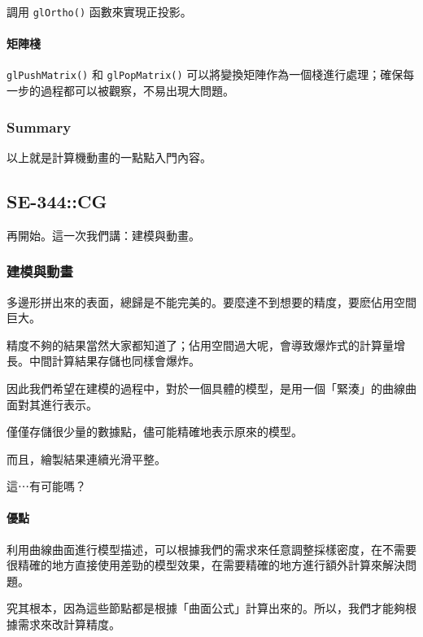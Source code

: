 \documentclass[
]{article}
\begin{document}
調用 \texttt{glOrtho()} 函數來實現正投影。

\hypertarget{header-n100}{%
\paragraph{矩陣棧}\label{header-n100}}

\texttt{glPushMatrix()} 和 \texttt{glPopMatrix()}
可以將變換矩陣作為一個棧進行處理；確保每一步的過程都可以被觀察，不易出現大問題。

\hypertarget{header-n102}{%
\subsubsection{Summary}\label{header-n102}}

以上就是計算機動畫的一點點入門內容。

\hypertarget{header-n104}{%
\subsection{SE-344::CG}\label{header-n104}}

再開始。這一次我們講：建模與動畫。

\hypertarget{header-n106}{%
\subsubsection{建模與動畫}\label{header-n106}}

多邊形拼出來的表面，總歸是不能完美的。要麼達不到想要的精度，要麽佔用空間巨大。

精度不夠的結果當然大家都知道了；佔用空間過大呢，會導致爆炸式的計算量增長。中間計算結果存儲也同樣會爆炸。

因此我們希望在建模的過程中，對於一個具體的模型，是用一個「緊湊」的曲線曲面對其進行表示。

僅僅存儲很少量的數據點，儘可能精確地表示原來的模型。

而且，繪製結果連續光滑平整。

這⋯有可能嗎？

\hypertarget{header-n113}{%
\paragraph{優點}\label{header-n113}}

利用曲線曲面進行模型描述，可以根據我們的需求來任意調整採樣密度，在不需要很精確的地方直接使用差勁的模型效果，在需要精確的地方進行額外計算來解決問題。

究其根本，因為這些節點都是根據「曲面公式」計算出來的。所以，我們才能夠根據需求來改計算精度。
\end{document}
